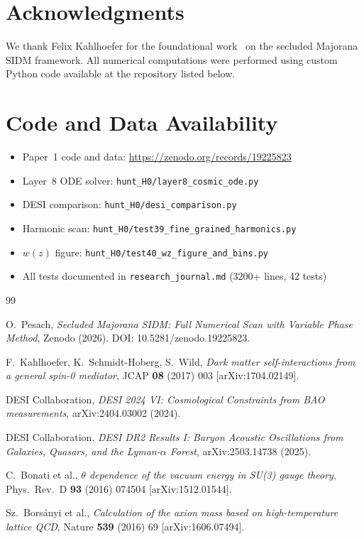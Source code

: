 \documentclass[11pt,a4paper]{article}
\begin{document}
\section*{Acknowledgments}

We thank Felix Kahlhoefer for the foundational work~\cite{Kahlhoefer2017} on the 
secluded Majorana SIDM framework. All numerical computations were performed using 
custom Python code available at the repository listed below.

\section*{Code and Data Availability}

\begin{itemize}[nosep]
  \item Paper~1 code and data: \url{https://zenodo.org/records/19225823}
  \item Layer~8 ODE solver: \texttt{hunt\_H0/layer8\_cosmic\_ode.py}
  \item DESI comparison: \texttt{hunt\_H0/desi\_comparison.py}
  \item Harmonic scan: \texttt{hunt\_H0/test39\_fine\_grained\_harmonics.py}
  \item $w(z)$ figure: \texttt{hunt\_H0/test40\_wz\_figure\_and\_bins.py}
  \item All tests documented in \texttt{research\_journal.md} (3200+ lines, 42 tests)
\end{itemize}

\begin{thebibliography}{99}

 O.~Pesach, \emph{Secluded Majorana SIDM: Full Numerical Scan with
Variable Phase Method}, Zenodo (2026). DOI: 10.5281/zenodo.19225823.

 F.~Kahlhoefer, K.~Schmidt-Hoberg, S.~Wild,
\emph{Dark matter self-interactions from a general spin-0 mediator},
JCAP \textbf{08} (2017) 003 [arXiv:1704.02149].

 DESI Collaboration,
\emph{DESI 2024 VI: Cosmological Constraints from BAO measurements},
arXiv:2404.03002 (2024).

 DESI Collaboration,
\emph{DESI DR2 Results I: Baryon Acoustic Oscillations from
Galaxies, Quasars, and the Lyman-$\alpha$ Forest},
arXiv:2503.14738 (2025).

 C.~Bonati et al.,
\emph{$\theta$ dependence of the vacuum energy in SU(3) gauge theory},
Phys.\ Rev.\ D \textbf{93} (2016) 074504 [arXiv:1512.01544].

 Sz.~Bors\'anyi et al.,
\emph{Calculation of the axion mass based on high-temperature lattice QCD},
Nature \textbf{539} (2016) 69 [arXiv:1606.07494].

\end{thebibliography}
\end{document}
